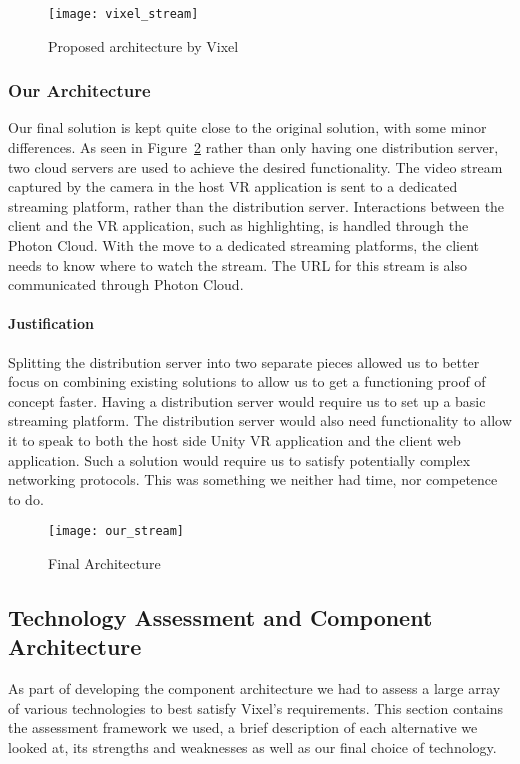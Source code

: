 \begin{figure}
    \texttt{[image: vixel\_stream]}
    \caption{Proposed architecture by Vixel}
    \label{fig:proposed_architecture}
\end{figure}

\subsubsection{Our Architecture}
Our final solution is kept quite close to the original solution, with some minor differences. As seen in Figure~\ref{fig:our_architecture} rather than only having one distribution server, two cloud servers are used to achieve the desired functionality. The video stream captured by the camera in the host VR application is sent to a dedicated streaming platform, rather than the distribution server. Interactions between the client and the VR application, such as highlighting, is handled through the Photon Cloud. With the move to a dedicated streaming platforms, the client needs to know where to watch the stream. The URL for this stream is also communicated through Photon Cloud.

\paragraph{Justification}
Splitting the distribution server into two separate pieces allowed us to better focus on combining existing solutions to allow us to get a functioning proof of concept faster. Having a distribution server would require us to set up a basic streaming platform. The distribution server would also need functionality to allow it to speak to both the host side Unity VR application and the client web application. Such a solution would require us to satisfy potentially complex networking protocols. This was something we neither had time, nor competence to do.

\begin{figure}
    \texttt{[image: our\_stream]}
    \caption{Final Architecture}
    \label{fig:our_architecture}
\end{figure}

\subsection{Technology Assessment and Component Architecture}
As part of developing the component architecture we had to assess a large array of various technologies to best satisfy Vixel's requirements. This section contains the assessment framework we used, a brief description of each alternative we looked at, its strengths and weaknesses as well as our final choice of technology.  

